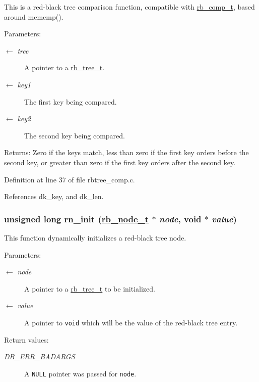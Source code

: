 This is a red-black tree comparison function, compatible with \hyperlink{group__dbprim__rbtree_ga3}{rb\_\-comp\_\-t}, based around memcmp().

\begin{Desc}
\item[Parameters:]
\begin{description}
\item[\mbox{$\leftarrow$} {\em tree}]A pointer to a \hyperlink{group__dbprim__rbtree_ga0}{rb\_\-tree\_\-t}. \item[\mbox{$\leftarrow$} {\em key1}]The first key being compared. \item[\mbox{$\leftarrow$} {\em key2}]The second key being compared.\end{description}
\end{Desc}
\begin{Desc}
\item[Returns:]Zero if the keys match, less than zero if the first key orders before the second key, or greater than zero if the first key orders after the second key.\end{Desc}


Definition at line 37 of file rbtree\_\-comp.c.

References dk\_\-key, and dk\_\-len.\hypertarget{group__dbprim__rbtree_ga14}{
\subsubsection[rn\_\-init]{\setlength{\rightskip}{0pt plus 5cm}unsigned long rn\_\-init (\hyperlink{struct__rb__node__s}{rb\_\-node\_\-t} $\ast$ {\em node}, void $\ast$ {\em value})}}
\label{group__dbprim__rbtree_ga14}


This function dynamically initializes a red-black tree node.

\begin{Desc}
\item[Parameters:]
\begin{description}
\item[\mbox{$\leftarrow$} {\em node}]A pointer to a \hyperlink{group__dbprim__rbtree_ga0}{rb\_\-tree\_\-t} to be initialized. \item[\mbox{$\leftarrow$} {\em value}]A pointer to {\tt void} which will be the value of the red-black tree entry.\end{description}
\end{Desc}
\begin{Desc}
\item[Return values:]
\begin{description}
\item[{\em DB\_\-ERR\_\-BADARGS}]A {\tt NULL} pointer was passed for {\tt node}.\end{description}
\end{Desc}


